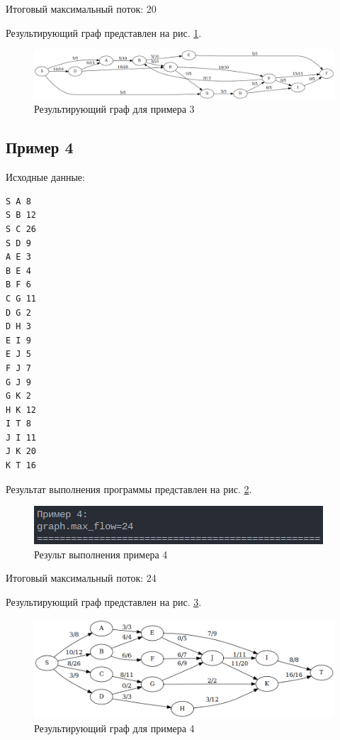 Итоговый максимальный поток: 20

Результирующий граф представлен на рис. \ref{fig:example_graph_3}.

\begin{figure}[H]
    \centering
    \includegraphics[width=\linewidth]{photo/example_graph_3}
    \caption{Результирующий граф для примера 3}
    \label{fig:example_graph_3}
\end{figure}

\subsection*{Пример 4}

Исходные данные:

\begin{lstlisting}
S A 8
S B 12
S C 26
S D 9
A E 3
B E 4
B F 6
C G 11
D G 2
D H 3
E I 9
E J 5
F J 7
G J 9
G K 2
H K 12
I T 8
J I 11
J K 20
K T 16
\end{lstlisting}

Результат выполнения программы представлен на рис. \ref{fig:example_4}.

\begin{figure}[H]
    \centering
    \includegraphics[width=\linewidth]{photo/example_4}
    \caption{Результ выполнения примера 4}
    \label{fig:example_4}
\end{figure}

Итоговый максимальный поток: 24

Результирующий граф представлен на рис. \ref{fig:example_graph_4}.

\begin{figure}[H]
    \centering
    \includegraphics[width=\linewidth]{photo/example_graph_4}
    \caption{Результирующий граф для примера 4}
    \label{fig:example_graph_4}
\end{figure}

